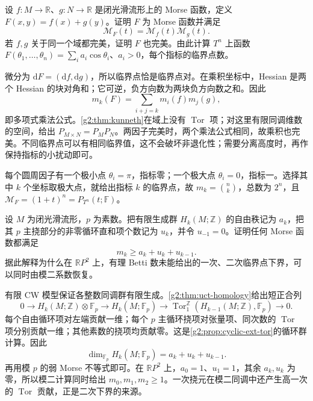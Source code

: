 \begin{exercise}\label{g2:ex:morse-product-functions}
	设 \(f:M\to\mathbb R\)、\(g:N\to\mathbb R\) 是闭光滑流形上的 Morse 函数，定义 \(F(x,y)=f(x)+g(y)\)。证明 \(F\) 为 Morse 函数并满足
	\[
		\mathcal M_F(t)=\mathcal M_f(t)\mathcal M_g(t).
	\]
	若 \(f,g\) 关于同一个域都完美，证明 \(F\) 也完美。由此计算 \(T^n\) 上函数 \(F(\theta_1,\ldots,\theta_n)=\sum_i a_i\cos\theta_i\)、\(a_i>0\)，每个指标的临界点数。
\end{exercise}
\begin{solution}
	微分为 \(\mathrm dF=(\mathrm df,\mathrm dg)\)，所以临界点恰是临界点对。在乘积坐标中，Hessian 是两个 Hessian 的块对角和；它可逆，负方向数为两块负方向数之和。因此
	\[
		m_k(F)=\sum_{i+j=k}m_i(f)m_j(g),
	\]
	即多项式乘法公式。\cref{g2:thm:kunneth}在域上没有 \(\operatorname{Tor}\) 项；对这里有限同调维数的空间，给出 \(P_{M\times N}=P_MP_N\)。两因子完美时，两个乘法公式相同，故乘积也完美。不同临界点可以有相同临界值，这不会破坏非退化性；需要分离高度时，再作保持指标的小扰动即可。

	每个圆周因子有一个极小点 \(\theta_i=\pi\)，指标零；一个极大点 \(\theta_i=0\)，指标一。选择其中 \(k\) 个坐标取极大点，就给出指标 \(k\) 的临界点，故 \(m_k=\binom nk\)，总数为 \(2^n\)，且 \(\mathcal M_F=(1+t)^n=P_{T^n}(t;\mathbb F)\)。
\end{solution}

\begin{exercise}\label{g2:ex:morse-torsion-bounds}
	设 \(M\) 为闭光滑流形，\(p\) 为素数。把有限生成群 \(H_k(M;\mathbb Z)\) 的自由秩记为 \(a_k\)，把其 \(p\) 主挠部分的非零循环直和项个数记为 \(u_k\)，并令 \(u_{-1}=0\)。证明任何 Morse 函数都满足
	\[
		m_k\ge a_k+u_k+u_{k-1}.
	\]
	据此解释为什么在 \(\mathbb RP^2\) 上，有理 Betti 数未能给出的一次、二次临界点下界，可以同时由模二系数恢复。
\end{exercise}
\begin{solution}
	有限 CW 模型保证各整数同调群有限生成。\cref{g2:thm:uct-homology}给出短正合列
	\[
		0\longrightarrow H_k(M;\mathbb Z)\otimes\mathbb F_p
		\longrightarrow H_k(M;\mathbb F_p)
		\longrightarrow\operatorname{Tor}_1^{\mathbb Z}(H_{k-1}(M;\mathbb Z),\mathbb F_p)
		\longrightarrow0.
	\]
	每个自由循环项对左端贡献一维；每个 \(p\) 主循环挠项对张量项、同次数的 \(\operatorname{Tor}\) 项分别贡献一维；其他素数的挠项均贡献零。这是\cref{g2:prop:cyclic-ext-tor}的循环群计算。因此
	\[
		\dim_{\mathbb F_p}H_k(M;\mathbb F_p)=a_k+u_k+u_{k-1}.
	\]
	再用模 \(p\) 的弱 Morse 不等式即可。在 \(\mathbb RP^2\) 上，\(a_0=1\)、\(u_1=1\)，其余 \(a_k,u_k\) 为零，所以模二计算同时给出 \(m_0,m_1,m_2\ge1\)。一次挠元在模二同调中还产生高一次的 \(\operatorname{Tor}\) 贡献，正是二次下界的来源。
\end{solution}


